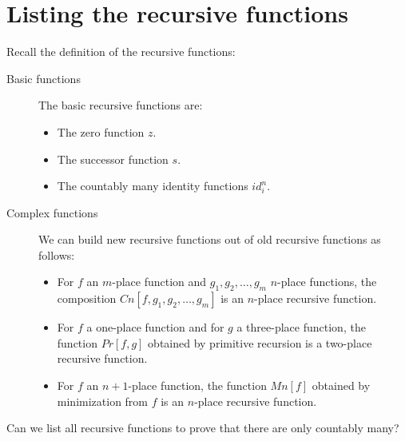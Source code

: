 \documentclass[justified]{tufte-handout}
\begin{document}
\section{Listing the recursive functions}

\noindent Recall the definition of the recursive functions:

\begin{description}
\item[Basic functions] The basic recursive functions are:
	\begin{itemize}
	\item The zero function $z$.
	\item The successor function $s$.
	\item The countably many identity functions $id^n_i$.
	\end{itemize}
\item[Complex functions] We can build new recursive functions out of old recursive functions as follows:
 	\begin{itemize}
	\item For $f$ an $m$-place function and $g_1,g_2,\dots,g_m$ $n$-place functions, the composition $Cn[f,g_1,g_2,\dots,g_m]$ is an $n$-place recursive function. 
	\item For $f$ a one-place function and for $g$ a three-place function, the function $Pr[f,g]$ obtained by primitive recursion is a two-place recursive function.
	\item For $f$ an $n+1$-place function, the function $Mn[f]$ obtained by minimization from $f$ is an $n$-place recursive function.\\
	\end{itemize}
\end{description}

\noindent Can we list all recursive functions to prove that there are only countably many?
\end{document}

